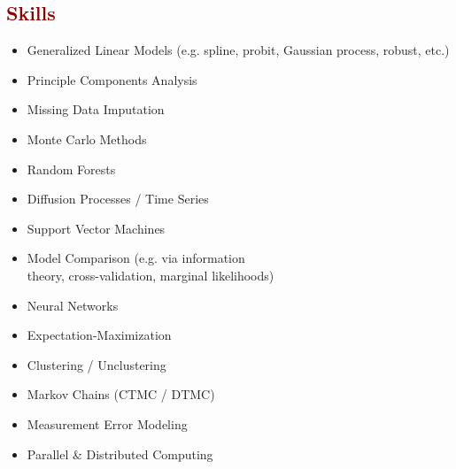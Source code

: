 \documentclass[11pt,margin,line]{resume}
\begin{document}
\begin{resume}
\section{\large\textcolor{DarkRed}{Skills}}

\begin{comment}
\textbf{Technical}: Generalized Linear Regression Analysis (e.g. Gaussian process, spline, poisson, logistic, robust, probit), PCA, Missing Data Imputation / Marginalization, Measurement Error Modeling, Stochastic Processes (e.g. CTMC / DTMC, birth-death, multivariate diffusion), Random Forests, Support Vector Machines, Neural Networks, Natural Language Processing, Expectation-Maximization, Model comparison (e.g. x-validation, information theoretic, marginal likelihood-based methods), Monte Carlo Methods, Clustering, Parallel \& Distributed Computing

\textbf{Other}: Science Communication, Teaching, Project Management, Hitchhiking, Public Speaking, Backpacking, Data Visualization, Googling, Computer Assembly \& Repair, Universal Design, Photography, Image Editing 
\end{comment}


\begin{multicols}{2}
    \begin{itemize}
    \setlength\itemsep{-0.2em}
         \item Generalized Linear Models (e.g. spline, probit, Gaussian process, robust, etc.)
         \item Principle Components Analysis
         \item Missing Data Imputation
	\item Monte Carlo Methods
         \item Random Forests
	\item Diffusion Processes / Time Series
         \item Support Vector Machines
	\item Model Comparison (e.g. via information\\ theory, cross-validation, marginal likelihoods)
         \item Neural Networks
	\item Expectation-Maximization
	\item Clustering / Unclustering
	\item Markov Chains (CTMC / DTMC)
	\item Measurement Error Modeling
	\item Parallel \& Distributed Computing
    \end{itemize}
    \end{multicols}\vspace{-4.5mm}


\end{resume}
\end{document}
